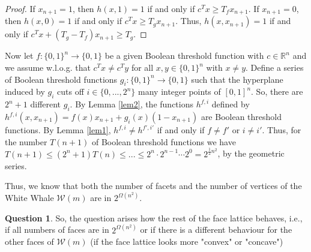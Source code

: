 \documentclass[11pt]{amsart}
\theoremstyle{definition}
\theoremstyle{definition}
\theoremstyle{question}
\newtheorem{question}{Question}
\newcommand\WW{\mathcal{W}}
\begin{document}
\begin{proof}
If $x_{n+1} = 1$, then $h(x,1) = 1$ if and only if $c^Tx \geq T_fx_{n+1}$. If $x_{n+1} = 0$, then $h(x,0) = 1$ if and only if $c^Tx \geq T_gx_{n+1}$. Thus, $h(x,x_{n+1})=1$ if and only if $c^Tx+(T_g-T_f)x_{n+1} \geq T_g$. 
\end{proof}

Now let $f \colon \{0,1 \}^n \rightarrow \{0,1 \}$ be a given Boolean threshold function with $c \in \mathbb{R}^n$ and we assume w.l.o.g. that $c^Tx \neq c^Ty$ for all $x,y \in \{0,1 \}^n$ with $x \neq y$. 
Define a series of Boolean threshold functions $g_i \colon \{0,1 \}^n \rightarrow \{0,1 \}$ such that the hyperplane induced by $g_i$ cuts off $i \in \{0,..., 2^n \}$ many integer points of $[0,1]^n$. So, there are $2^n+1$ different $g_i$. By Lemma \ref{lem2}, the functions $h^{f,i}$ defined by $h^{f,i}(x,x_{n+1}) = f(x)x_{n+1} + g_i(x)(1-x_{n+1})$ are Boolean threshold functions. By Lemma \ref{lem1}, $h^{f,i} \neq h^{f',i'}$ if and only if $f \neq f'$ or $i \neq i'$. Thus, for the number $T(n+1)$ of Boolean threshold functions we have $T(n+1) \leq (2^n+1)T(n) \leq... \leq 2^n \cdot 2^{n-1} \cdots 2^0 = 2^{\frac{1}{2}n^2}$, by the geometric series.

Thus, we know that both the number of facets and the number of vertices of the White Whale $\WW(m)$ are in $2^{\Omega(n^2)}$. 

\begin{question}
So, the question arises how the rest of the face lattice behaves, i.e., if all numbers of faces are in $2^{\Omega(n^2)}$ or if there is a different behaviour for the other faces of $\WW(m)$ (if the face lattice looks more "convex" or "concave")
\end{question}
\end{document}
